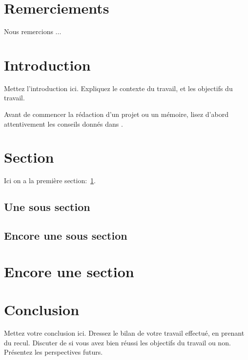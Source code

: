 \documentclass[12pt,a4paper, titlepage]{article}
\begin{document}
\section*{Remerciements}

Nous remercions ...\\

\newpage
\tableofcontents


\newpage
\section*{Introduction}
Mettez l'introduction ici. Expliquez le contexte du travail, et les objectifs du travail.

Avant de commencer la r\'edaction d'un projet ou un mémoire, lisez d'abord attentivement les conseils donn\'es dans \cite{Melot2007UMONS}.

\newpage

\section{Section}%
\label{sec:1}

Ici on a la premi\`ere section:~\ref{sec:1}.

\subsection{Une sous section}

\subsection{Encore une sous section}

\section{Encore une section}


\section*{Conclusion}

Mettez votre conclusion ici.  Dressez le bilan de votre travail effectué, en prenant du recul. Discuter de si vous avez bien réussi les objectifs du travail ou non. Présentez les perspectives futurs.





\end{document}
